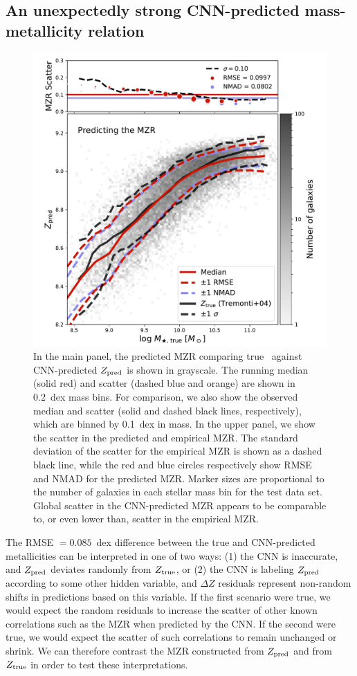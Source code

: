 \documentclass[fleqn,usenatbib]{mnras}
\begin{document}
\subsection{An unexpectedly strong CNN-predicted mass-metallicity relation}
\begin{figure}
	\includegraphics[width=\columnwidth]{06-mzr.pdf}
	\caption{\label{fig:mzr}
		In the main panel, the predicted MZR comparing true \mstar\ against CNN-predicted $Z_{\rm pred}$ is shown in grayscale. The running median (solid red) and scatter (dashed blue and orange) are shown in 0.2~dex mass bins. For comparison, we also show the \citet{Tremonti2004} observed median and scatter (solid and dashed black lines, respectively), which are binned by 0.1~dex in mass. In the upper panel, we show the scatter in the predicted and empirical MZR. The standard deviation of the scatter for the empirical MZR is shown as a dashed black line, while the red and blue circles respectively show RMSE and NMAD for the predicted MZR. Marker sizes are proportional to the number of galaxies in each stellar mass bin for the test data set. Global scatter in the CNN-predicted MZR appears to be comparable to, or even lower than, scatter in the empirical MZR.}
\end{figure}

The RMSE $= 0.085$~dex difference between the true and CNN-predicted metallicities can be interpreted in one of two ways: (1) the CNN is inaccurate, and $Z_{\rm pred}$ deviates randomly from $Z_{\rm true}$, or (2) the CNN is labeling $Z_{\rm pred}$ according to some other hidden variable, and $\Delta Z$ residuals represent non-random shifts in predictions based on this variable. If the first scenario were true, we would expect the random residuals to increase the scatter of other known correlations such as the MZR when predicted by the CNN. If the second were true, we would expect the scatter of such correlations to remain unchanged or shrink. We can therefore contrast the MZR constructed from $Z_{\rm pred}$ and from $Z_{\rm true}$ in order to test these interpretations.
\end{document}
